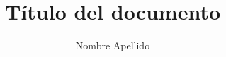\documentclass[letterpaper, 11pt]{article} %
\author{Nombre Apellido}
\title{Título del documento}
\begin{document}


\restoregeometry


\newpage

\nocite{*} 

\end{document}
